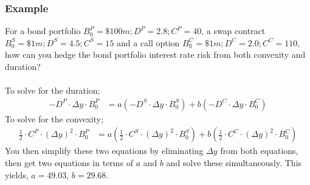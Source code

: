 \documentclass[a4paper]{article}
\begin{document}
\subsubsection{Example}
For a bond portfolio $B_0^P = \$100m; D^P = 2.8; C^P = 40$,
a swap contract $B_0^S = \$1m; D^S = 4.5; C^S = 15$ and a call option
$B_0^C = \$1m; D^C = 2.0; C^C = 110$, how can you hedge the bond portfolio
interest rate risk from both convexity and duration? \\\\
%
%
To solve for the duration;
\begin{align*}
-D^P \cdot \Delta y \cdot B_0^P &= a(-D^S \cdot \Delta y \cdot B_0^S) +
b(-D^C \cdot \Delta y \cdot B_0^C)
\end{align*}
To solve for the convexity;
\begin{align*}
\frac{1}{2} \cdot C^P \cdot (\Delta y)^2 \cdot B_0^P &=
a(\frac{1}{2} \cdot C^S \cdot (\Delta y)^2 \cdot B_0^S) +
b(\frac{1}{2} \cdot C^C \cdot (\Delta y)^2 \cdot B_0^C)
\end{align*}
You then simplify these two equations by eliminating $\Delta y$ from both
equations, then get two equations in terms of $a$ and $b$ and solve these
simultaneously. This yields, $a = 49.03$, $b = 29.68$.


\iffalse
\section{Structured Products and Securitisation}
Packages of one or more derivatives, assets and or dynamic trading strategies
into a note, a type of bond format. Structured notes are often exposed to risks
that have little to do normal bond risk.
\textbf{OKAY THIS IS REALLY DENSE REVIEW THIS}


\fi
\end{document}
